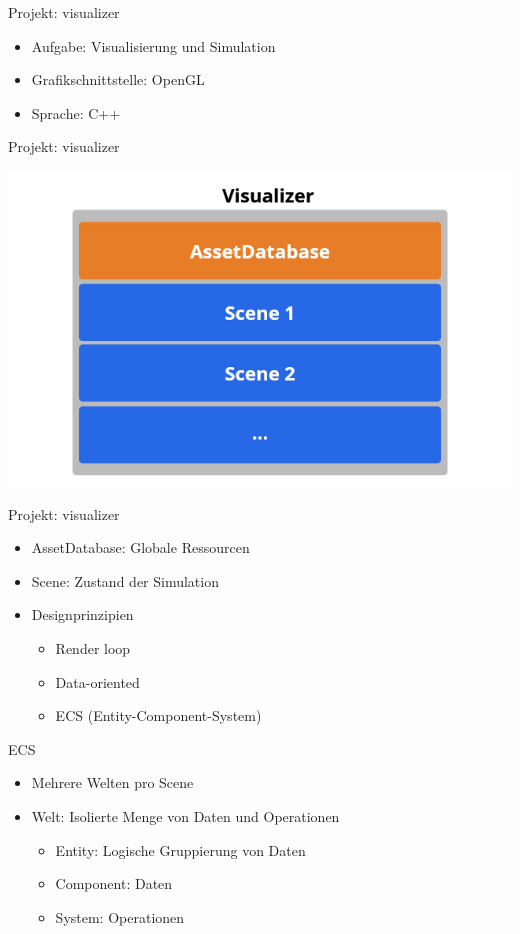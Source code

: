 \documentclass{presentation}
\begin{document}
\begin{frame}{Projekt: visualizer}
    \begin{itemize}
        \item Aufgabe: Visualisierung und Simulation
        \item Grafikschnittstelle: OpenGL
        \item Sprache: C++
    \end{itemize}
\end{frame}

\begin{frame}{Projekt: visualizer}
    \begin{center}
        \includegraphics[width=\textwidth]{visualizer_structure.jpg}
    \end{center}
\end{frame}

\begin{frame}{Projekt: visualizer}
    \begin{itemize}
        \item AssetDatabase: Globale Ressourcen
        \item Scene: Zustand der Simulation
        \item Designprinzipien
        \begin{itemize}
            \item Render loop
            \item Data-oriented
            \item ECS (Entity-Component-System)
        \end{itemize}
    \end{itemize}
\end{frame}

\begin{frame}{ECS}
    \begin{itemize}
        \item Mehrere Welten pro Scene
        \item Welt: Isolierte Menge von Daten und Operationen
        \begin{itemize}
            \item Entity: Logische Gruppierung von Daten
            \item Component: Daten
            \item System: Operationen
        \end{itemize}
    \end{itemize}
\end{frame}
\end{document}
